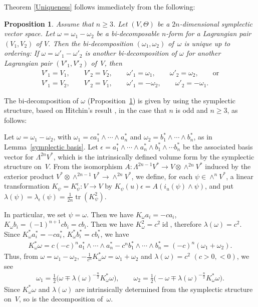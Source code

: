 \documentclass[11pt]{article}
\newtheorem{Prop}[Th]{Proposition}
\begin{document}
Theorem \ref{Uniqueness} follows immediately from the following:

\begin{Prop}
\label{uniqueness 2}
Assume that $n\geq 3$.
Let $(V,\Theta)$ be a $2n$-dimensional symplectic vector space.
Let $\omega=\omega_1-\omega_2$ be a bi-decomposable
$n$-form for a Lagrangian pair $(V_1, V_2)$ of $V$.
Then the bi-decomposition $(\omega_1, \omega_2)$ of~$\omega$
is unique up to ordering:
If $\omega=\omega'_1-\omega'_2$ is another bi-decomposition
of $\omega$ for another Lagrangian pair $(V'_1, V'_2)$ of~$V$, then
\begin{gather*}
V'_1 = V_1, \qquad V'_2 = V_2, \qquad \omega'_1 = \omega_1, \qquad \omega'_2 = \omega_2,
\qquad {\mathrm{or}} \\
V'_1 = V_2, \qquad V'_2 = V_1, \qquad \omega'_1 = - \omega_2, \qquad \omega'_2 = - \omega_1.
\end{gather*}
\end{Prop}



The bi-decomposition of $\omega$ (Proposition~\ref{uniqueness 2})
is given by using the symplectic structure,
based on Hitchin's result \cite[Propositions 2.1,~2.2]{H},
in the case that $n$ is odd and $n \geq 3$, as follows:

Let $\omega = \omega_1 - \omega_2$, with
$\omega_1 = c a_1^*\wedge \cdots \wedge a_n^*$
and
$\omega_2 = b_1^*\wedge \cdots \wedge b_n^*$, as in
Lemma~\ref{symplectic basis}.
Let $\epsilon=a^*_1\wedge \cdots \wedge a^*_n
\wedge b^*_1\wedge \cdots b^*_n$
be the associated basis vector for $\Lambda^{2n}V^*$,
which is the
intrinsically def\/ined volume form by the symplectic structure on~$V$.
From the isomorphism $A\colon \Lambda^{2n-1}V^* \longrightarrow
V\otimes \wedge^{2n}V^*$ induced by the exterior product
$V^*\otimes\wedge^{2n-1}V^* \to \wedge^{2n}V^*$,
we def\/ine, for each $\psi \in \wedge^nV^*$,
a linear transformation
$K_{\psi}=K_{\psi}^{\epsilon}\colon V \longrightarrow V$ by
$K_{\psi}(u)\epsilon = A(i_u(\psi)\wedge \psi)$, and put
$\lambda(\psi)=\lambda_{\epsilon}(\psi)=
\frac{1}{2n}\operatorname{tr}(K_{\psi}^2)$.

In particular, we set $\psi = \omega$.
Then we have $K_{\omega}a_i=-c a_i$, $K_{\omega}b_i
= (-1)^{n+1} c b_i = cb_i$.
Then we have $K_{\omega}^2 = c^2\operatorname{id}$,
therefore $\lambda(\omega) = c^2$.
Since $K_{\omega}^*a_i^* = -ca_i^*$, $K_{\omega}^*b_i^* =cb_i^* $,
we have
\begin{gather*}
K_{\omega}^*\omega = c(-c)^n a^*_1\wedge \cdots \wedge a^*_n -
c^{n}b^*_1\wedge \cdots \wedge b^*_n =
(-c)^n(\omega_1 + \omega_2).
\end{gather*}
Thus, from
$\omega={\omega}_1-{\omega}_2$, $-\frac{1}{c^n}K_{\omega}^*\omega={\omega}_1+{\omega}_2$
and $\lambda(\omega) = c^2$ $(c >0, <0)$,
we see
\begin{gather*}
\omega_1 = \frac{1}{2}\big(\omega \mp \lambda(\omega)^{-\frac{n}{2}}
K_{\omega}^*\omega\big),\qquad
\omega_2= \frac{1}{2}\big({-}\omega \mp \lambda(\omega)^{-\frac{n}{2}}
K_{\omega}^*\omega\big).
\end{gather*}
Since $K_{\omega}^*\omega$ and $\lambda(\omega)$ are
intrinsically determined from the symplectic structure on~$V$,
so is the decomposition of~$\omega$.
\end{document}
